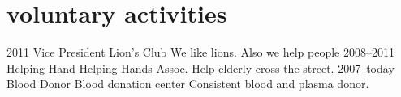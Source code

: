 \section{voluntary activities}

\begin{entrylist}
\entry
{2011}
{Vice President}
{Lion's Club}
{We like lions. Also we help people}
\entry
{2008--2011}
{Helping Hand}
{Helping Hands Assoc.}
{Help elderly cross the street.}
\entry
{2007--today}
{Blood Donor}
{Blood donation center}
{Consistent blood and plasma donor.}
\end{entrylist}
